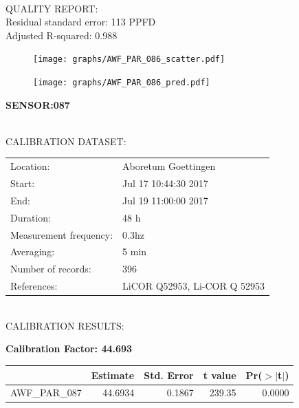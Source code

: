 \documentclass[oneside]{report}
\begin{document}
\hrulefill\\
QUALITY REPORT:\\
Residual standard error: 113 PPFD\\
Adjusted R-squared: 0.988



\begin{figure}[H]
  \centering
  \texttt{[image: graphs/AWF\_PAR\_086\_scatter.pdf]}
\end{figure}




\begin{figure}[H]
  \centering
  \texttt{[image: graphs/AWF\_PAR\_086\_pred.pdf]}
\end{figure}

\pagebreak


\begin{center}
\large{\textbf{SENSOR:087}}\\
\end{center}

\hrulefill\\
CALIBRATION DATASET:\\
\begin{table}[h!]
  \centering
  \label{tab:table1}
  \begin{tabular}{ll}
    Location: & Aboretum Goettingen\\ 
    
    
    Start:  & Jul 17 10:44:30 2017 \\
    End:   & Jul 19 11:00:00 2017\\ 
    Duration: & 48 h\\
    Measurement frequency: & 0.3hz\\
    Averaging:  &5 min\\
    Number of records: & 396 \\
    References: & LiCOR Q52953, Li-COR Q 52953 \\
  \end{tabular}
\end{table}

\hrulefill\\
CALIBRATION RESULTS:\\


\begin{center}
\textbf{\large{Calibration Factor: 44.693}}\\
\end{center}
\begin{table}[ht]
\centering
\begin{tabular}{rrrrr}
  \hline
 & Estimate & Std. Error & t value & Pr($>$$|$t$|$) \\ 
  \hline
AWF\_PAR\_087 & 44.6934 & 0.1867 & 239.35 & 0.0000 \\ 
   \hline
\end{tabular}
\end{table}
\end{document}
